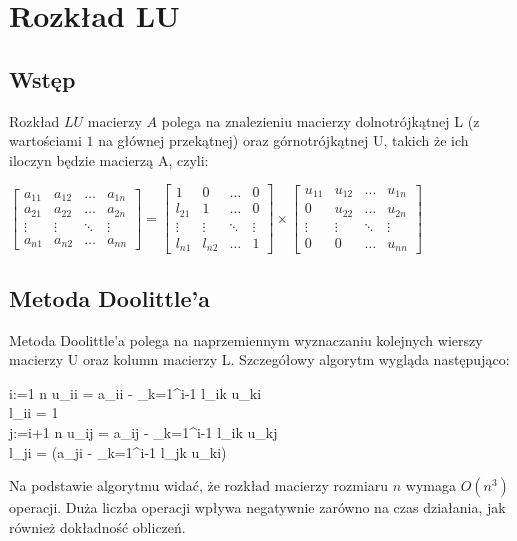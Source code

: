 \documentclass[11pt]{article}
\begin{document}
\section{Rozkład LU}
\subsection{Wstęp}
Rozkład $LU$ macierzy $A$ polega na znalezieniu macierzy dolnotrójkątnej L (z wartościami $1$ na głównej przekątnej) oraz górnotrójkątnej U, takich że ich iloczyn będzie macierzą A, czyli:
\begin{center}
\begin{math}
\begin{bmatrix}
    a_{11} & a_{12} & \dots  & a_{1n} \\
    a_{21} & a_{22} & \dots  & a_{2n} \\
    \vdots & \vdots & \ddots & \vdots \\
    a_{n1} & a_{n2} & \dots  & a_{nn}
\end{bmatrix}
=
\begin{bmatrix}
    1 & 0  & \dots  & 0 \\
    l_{21} & 1 & \dots  & 0 \\
    \vdots & \vdots & \ddots & \vdots \\
    l_{n1} & l_{n2} & \dots  & 1
\end{bmatrix}
\times
\begin{bmatrix}
    u_{11} & u_{12} & \dots  & u_{1n} \\
    0 & u_{22} & \dots  & u_{2n} \\
    \vdots & \vdots & \ddots & \vdots \\
    0 & 0 & \dots  & u_{nn}
\end{bmatrix}
\end{math}
\end{center}

\subsection{Metoda Doolittle’a}
Metoda Doolittle’a polega na naprzemiennym wyznaczaniu kolejnych wierszy macierzy U oraz kolumn macierzy L. Szczegółowy algorytm wygląda następująco:
\begin{program}
  \FOR i:=1 \TO n \DO
	u_{ii} = a_{ii} - \sum_{k=1}^{i-1} l_{ik} u_{ki}\\
	l_{ii} = 1\\
	\FOR j:=i+1 \TO n \DO
		u_{ij} = a_{ij} - \sum_{k=1}^{i-1} l_{ik} u_{kj}\\
		l_{ji} =  (a_{ji} - \sum_{k=1}^{i-1} l_{jk} u_{ki})\\
\end{program}
Na podstawie algorytmu widać, że rozkład macierzy rozmiaru $n$ wymaga $O(n^{3})$ operacji. Duża liczba operacji wpływa negatywnie zarówno na czas działania, jak również dokładność obliczeń. 
\end{document}
